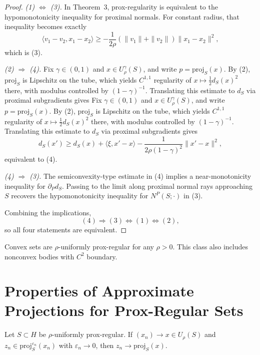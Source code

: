 \begin{proposition}
\begin{proof}
\smallskip
\noindent\emph{(1) $\Leftrightarrow$ (3).}
In Theorem~3, prox-regularity is equivalent to the hypomonotonicity inequality for proximal normals. For constant radius, that inequality becomes exactly
$$
\langle v_1-v_2,x_1-x_2\rangle
\ge -\frac{1}{2\rho}(\|v_1\|+\|v_2\|)\|x_1-x_2\|^2,
$$
which is (3).

\smallskip
\noindent\emph{(2) $\Rightarrow$ (4).}
Fix $\gamma\in(0,1)$ and $x\in U_\rho^\gamma(S)$, and write $p=\text{proj}_S(x)$. By (2), $\text{proj}_S$ is Lipschitz on the tube, which yields $C^{1,1}$ regularity of $x\mapsto \frac12 d_S(x)^2$ there, with modulus controlled by $(1-\gamma)^{-1}$. Translating this estimate to $d_S$ via proximal subgradients gives
Fix $\gamma\in(0,1)$ and $x\in U_\rho^\gamma(S)$, and write $p=\text{proj}_S(x)$. By (2), $\text{proj}_S$ is Lipschitz on the tube, which yields $C^{1,1}$ regularity of $x\mapsto \frac12 d_S(x)^2$ there, with modulus controlled by $(1-\gamma)^{-1}$. Translating this estimate to $d_S$ via proximal subgradients gives
$$
d_S(x')\ge d_S(x)+\langle\xi,x'-x\rangle - \frac{1}{2\rho(1-\gamma)^2}\|x'-x\|^2,
$$
equivalent to (4).

\smallskip
\noindent\emph{(4) $\Rightarrow$ (3).}
The semiconvexity-type estimate in (4) implies a near-monotonicity inequality for $\partial_P d_S$. Passing to the limit along proximal normal rays approaching $S$ recovers the hypomonotonicity inequality for $N^P(S;\cdot)$ in (3).

Combining the implications,
$$
(4)\Rightarrow(3)\Leftrightarrow(1)\Leftrightarrow(2),
$$
so all four statements are equivalent.
\end{proof}
\end{proposition}

\begin{remark}
Convex sets are $\rho$-uniformly prox-regular for any $\rho > 0$. This class also includes nonconvex bodies with $C^2$ boundary.
\end{remark}

\section{Properties of Approximate Projections for Prox-Regular Sets}

\begin{proposition}
\label{prop:approx_proj_convergence}
Let $S \subset H$ be $\rho$-uniformly prox-regular. If $(x_n) \to x \in U_\rho(S)$ and $z_n \in \text{proj}_S^{\varepsilon_n}(x_n)$ with $\varepsilon_n \to 0$, then $z_n \to \text{proj}_S(x)$.
\end{proposition}

